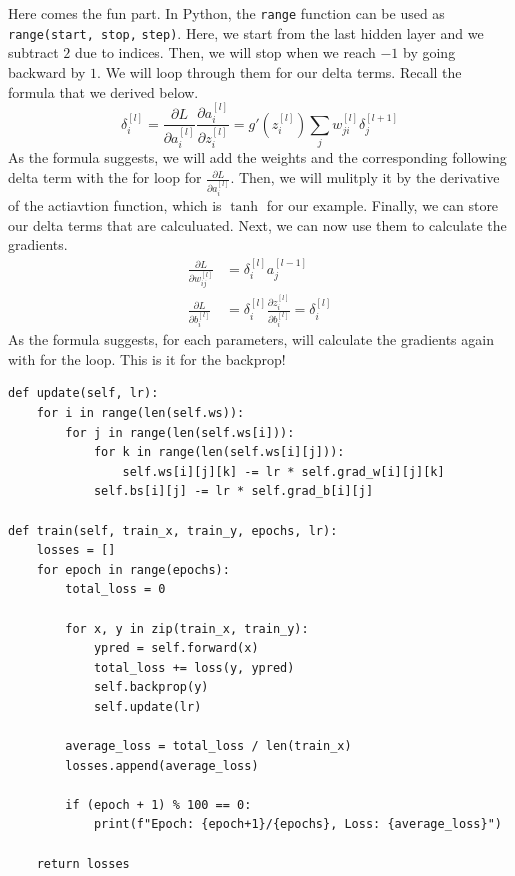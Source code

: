 \documentclass[../../../main.tex]{subfiles}
\begin{document}
Here comes the fun part. In Python, the \verb|range| function can be
used as \verb|range(start, stop,| \verb|step)|. Here, we start from
the last hidden layer and we subtract $2$ due to indices. Then,
we will stop when we reach $-1$ by going backward by $1$. We will
loop through them for our delta terms. Recall the formula that we
derived below.
\[
\delta_i^{[l]}
= \frac{\partial L}{\partial a_i^{[l]}}
    \frac{\partial a_i^{[l]}}{\partial z_i^{[l]}}
= g'\left(z_i^{[l]}\right) \sum_j w_{ji}^{[l]} \delta_j^{[l+1]}
\]
As the formula suggests, we will add the weights and the
corresponding following delta term with the for loop for
$\frac{\partial L}{\partial a_i^{[l]}}$. Then, we will mulitply
it by the derivative of the actiavtion function, which is $\tanh$
for our example. Finally, we can store our delta terms that are
calculuated. Next, we can now use them to calculate the gradients.
\begin{align*}
\frac{\partial L}{\partial w_{ij}^{[l]}}
&= \delta_i^{[l]} a_j^{[l-1]} \\
\frac{\partial L}{\partial b_i^{[l]}}
&= \delta_i^{[l]} \frac{\partial z_i^{[l]}}{\partial b_i^{[l]}}
= \delta_i^{[l]}
\end{align*}
As the formula suggests, for each parameters, will calculate
the gradients again with for the loop. This is it for the backprop!

\begin{jupyter}
\begin{lstlisting}[style=jin]
def update(self, lr):
    for i in range(len(self.ws)):
        for j in range(len(self.ws[i])):
            for k in range(len(self.ws[i][j])):
                self.ws[i][j][k] -= lr * self.grad_w[i][j][k]
            self.bs[i][j] -= lr * self.grad_b[i][j]

def train(self, train_x, train_y, epochs, lr):
    losses = []
    for epoch in range(epochs):
        total_loss = 0

        for x, y in zip(train_x, train_y):
            ypred = self.forward(x)
            total_loss += loss(y, ypred)
            self.backprop(y)
            self.update(lr)

        average_loss = total_loss / len(train_x)
        losses.append(average_loss)
        
        if (epoch + 1) % 100 == 0:
            print(f"Epoch: {epoch+1}/{epochs}, Loss: {average_loss}")
            
    return losses
\end{lstlisting}
\begin{lstlisting}[style=jout]
\end{lstlisting}
\end{jupyter}
\end{document}
